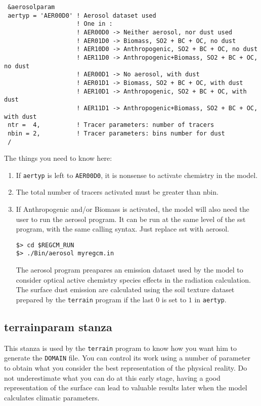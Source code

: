 {\footnotesize
\begin{Verbatim}
 &aerosolparam
 aertyp = 'AER00D0' ! Aerosol dataset used
                    ! One in :
                    ! AER00D0 -> Neither aerosol, nor dust used
                    ! AER01D0 -> Biomass, SO2 + BC + OC, no dust
                    ! AER10D0 -> Anthropogenic, SO2 + BC + OC, no dust
                    ! AER11D0 -> Anthropogenic+Biomass, SO2 + BC + OC, no dust
                    ! AER00D1 -> No aerosol, with dust
                    ! AER01D1 -> Biomass, SO2 + BC + OC, with dust
                    ! AER10D1 -> Anthropogenic, SO2 + BC + OC, with dust
                    ! AER11D1 -> Anthropogenic+Biomass, SO2 + BC + OC, with dust
 ntr =  4,          ! Tracer parameters: number of tracers
 nbin = 2,          ! Tracer parameters: bins number for dust
 /
\end{Verbatim}
}

The things you need to know here:

\begin{enumerate}
\item If \verb=aertyp= is left to \verb=AER00D0=, it is nonsense to activate
chemistry in the model.
\item The total number of tracers activated must be greater than nbin.
\item If Anthropogenic and/or Biomass is activated, the model will also need
the user to run the aerosol program. It can be run at the same level of the
sst program, with the same calling syntax. Just replace sst with aerosol.
\begin{Verbatim}
$> cd $REGCM_RUN
$> ./Bin/aerosol myregcm.in
\end{Verbatim}
The aerosol program preapares an emission dataset used by the model
to consider optical active chemistry species effects in the radiation
calculation. The surface dust emission are calculated using the soil
texture dataset prepared by the \verb=terrain= program if the last
$0$ is set to $1$ in \verb=aertyp=.
\end{enumerate}

\subsection{terrainparam stanza}
\label{terparam}
This stanza is used by the \verb=terrain= program to know how you want him
to generate the \verb=DOMAIN= file. You can control its work using a number of
parameter to obtain what you consider the best representation of the
physical reality. Do not underestimate what you can do at this early stage,
having a good representation of the surface can lead to valuable results
later when the model calculates climatic parameters.

